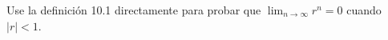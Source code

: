 \item Use la definición 10.1 directamente para probar que $\lim_{n \to \infty} r^n = 0$ cuando $|r| < 1$.
